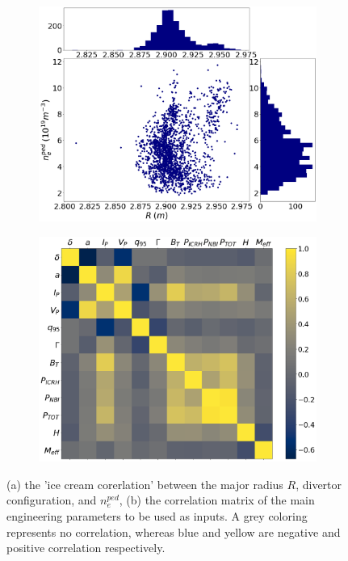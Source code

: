 \documentclass[a4paper, twoside, final, 12pt]{article}
\begin{document}
\begin{figure}
        \centering
        \begin{subfigure}{0.5\linewidth}
                \centering
                \includegraphics[scale=0.2]{./src/R_vs_NEPED_matplotlib}
                \caption{}
                \label{subfig:rvsneped}
        \end{subfigure} \hfill
        \begin{subfigure}{0.45\linewidth}
                \centering
                \includegraphics[scale=0.2]{./src/input_correlations}
                \caption{}
                \label{subfig:corr_shit}
        \end{subfigure}
	\caption{(a) the 'ice cream corerlation' between the major radius $R$, divertor configuration, and $n_e^{ped}$,  (b) the correlation matrix of the main engineering parameters to be used as inputs. A grey coloring represents no correlation, whereas blue and yellow are negative and positive correlation respectively.  }
	\label{fig:emperical}
\end{figure}
\end{document}
